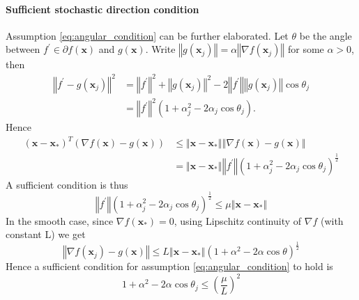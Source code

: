 \documentclass{article}
\renewcommand{\vec}[1]{\boldsymbol{#1}}
\newcommand{\norm}[1]{\left\Vert #1 \right\Vert}
\begin{document}
\paragraph{Sufficient stochastic direction condition} Assumption \ref{eq:angular_condition} can be further elaborated.
Let $\theta$ be the angle between $f^\prime \in\partial f(\vec{x})$ and $g(\vec{x})$. Write $\norm{g(\vec{x}_j)} = \alpha \norm{\nabla f(\vec{x}_j)}$ for some $\alpha>0$,
then
\begin{align}
	\norm{f^\prime-g(\vec{x}_j)}^2 &= \norm{f^\prime}^2 + \norm{g(\vec{x}_j)}^2 -2\norm{f^\prime}\norm{g(\vec{x}_j)}\cos\theta_j\\
	&=  \norm{f^\prime}^2(1+\alpha_j^2-2\alpha_j \cos\theta_j).
\end{align}
Hence
\begin{align}
	(\vec{x}-\vec{x}_*)^T (\nabla f(\vec{x}) -g(\vec{x})) &\leq \norm{\vec{x}-\vec{x}_*} \norm{\nabla f(\vec{x}) -g(\vec{x})}\\
	&= \norm{\vec{x}-\vec{x}_*} \norm{f^\prime}(1+\alpha_j^2-2\alpha_j \cos\theta_j)^{\frac{1}{2}}
\end{align}
A sufficient condition is thus
\begin{equation}
\norm{f^\prime}(1+\alpha_j^2-2\alpha_j \cos\theta_j)^{\frac{1}{2}} \leq \mu \norm{\vec{x}-\vec{x}_*}
\end{equation}
In the smooth case, since $\nabla f(\vec{x}_*)=0$, using Lipschitz continuity of $\nabla f$ (with constant L) we get
\begin{equation}
	\norm{\nabla f(\vec{x}_j)-g(\vec{x})} \leq L\norm{\vec{x}-\vec{x}_*} (1+\alpha^2-2\alpha \cos\theta)^{\frac{1}{2}}
\end{equation}
Hence a sufficient condition for assumption \ref{eq:angular_condition} to hold is
\begin{equation}
	1+\alpha^2-2\alpha \cos\theta_j\leq (\frac{\mu}{L})^2
\end{equation}
\end{document}
